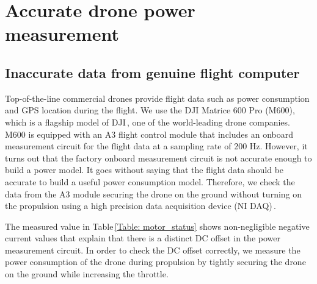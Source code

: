 \documentclass[journal]{./template/IEEEtran}
\begin{document}
\section{Accurate drone power measurement}
\label{Section: Challenges in drone power measurement}





\subsection{Inaccurate data from genuine flight computer}

Top-of-the-line commercial drones provide flight data such as power consumption and GPS location during the flight. 
We use the DJI Matrice 600 Pro (M600), which is a flagship model of DJI\,\cite{ref_11}, one of the world-leading drone companies. 
M600 is equipped with an A3 flight control module that includes an onboard measurement circuit for the flight data at a sampling rate of 200 Hz. However, it turns out that the factory onboard measurement circuit is not accurate enough to build a power model. 
It goes without saying that the flight data should be accurate to build a useful power consumption model.
Therefore, we check the data from the A3 module securing the drone on the ground without turning on the propulsion using a high precision data acquisition device (NI DAQ)\,\cite{ref_12}. 

\begin{table}[ht]
\caption{An example of inaccurate data from the genuine flight module of M600 drone when it is parked as a ready state on the ground. (All motors and propellers are fully stopped.)}
\label{Table: motor_status}
\end{table}

The measured value in Table\,\ref{Table: motor_status} shows non-negligible negative current values that explain that there is a distinct DC offset in the power measurement circuit.
In order to check the DC offset correctly, we measure the power consumption of the drone during propulsion by tightly securing the drone on the ground while increasing the throttle.
\end{document}
